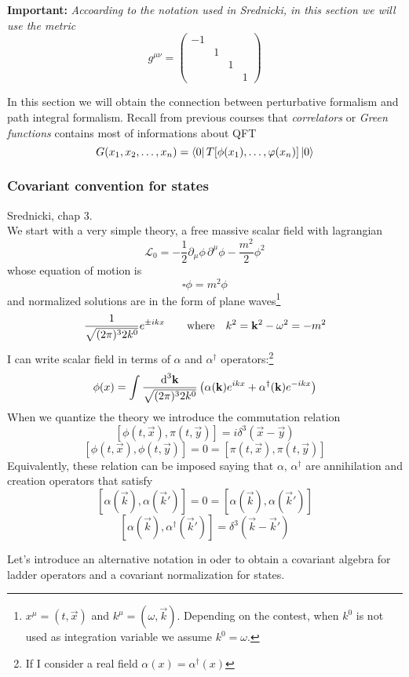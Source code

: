 \documentclass[../main/main.tex]{subfiles}
\begin{document}
\textbf{Important:} \textit{Accoarding to the notation used in Srednicki, in this section we will use the metric}
\[g^{\mu\nu}=\begin{pmatrix}-1&&&\\&1&&\\&&1&\\&&&1\end{pmatrix}\]


In this section we will obtain the connection between perturbative formalism and path integral formalism.
Recall from previous courses that \emph{correlators} or \emph{Green functions} contains most of informations about QFT
\[G(x_1,x_2,\dots,x_n)=\bra0T[\phi(x_1),\dots,\varphi(x_n)]\ket0\]

\subsubsection{Covariant convention for states}
\textsf{Srednicki, chap 3}.\\

We start with a very simple theory, a free massive scalar field with lagrangian
\[\mathcal L_0=-\frac12\partial_\mu\phi\,\partial^\mu\phi-\frac{m^2}2\phi^2\]
whose  equation of motion is 
\[\square\phi=m^2\phi\]
and normalized solutions are in the form of plane waves\footnote{$x^\mu=(t,\vec x)$ and $k^\mu=(\omega,\vec k)$. Depending on the contest, when $k^0$ is not used as integration variable we assume $k^0=\omega$.}
\[ \frac1{\sqrt{(2\pi)^32k^0}}e^{\pm ik x}\qquad\textup{where}\quad k^2=\vec k^2-\omega^2=-m^2\]
I can write scalar field in terms of $\alpha$ and $\alpha^\dagger$ operators:\footnote{If I consider a real field $\alpha(x)=\alpha^\dagger(x)$}
\[\phi(x)=\int\frac{\de^3\vec k}{\sqrt{(2\pi)^32k^0}}\left(\alpha(\vec k)e^{ikx}+\alpha^\dagger(\vec k)e^{-ikx}\right)\]
When we quantize the theory we introduce the commutation relation
\[[\phi(t,\vec x),\pi(t,\vec y)]=i\delta^3(\vec x-\vec y)\]
\[[\phi(t,\vec x),\phi(t,\vec y)]=0=[\pi(t,\vec x),\pi(t,\vec y)]\]
Equivalently, these relation can be imposed saying that $\alpha$, $\alpha^\dagger$ are annihilation and creation operators that satisfy
\[[\alpha(\vec k),\alpha(\vec k')]=0=[\alpha(\vec k),\alpha(\vec k')]\]
\[[\alpha(\vec k), \alpha^\dagger(\vec k')]=\delta^3(\vec k-\vec k')\]

\skipline


Let's introduce an alternative notation in oder to obtain a covariant algebra for ladder operators and a covariant normalization for states.
\end{document}

